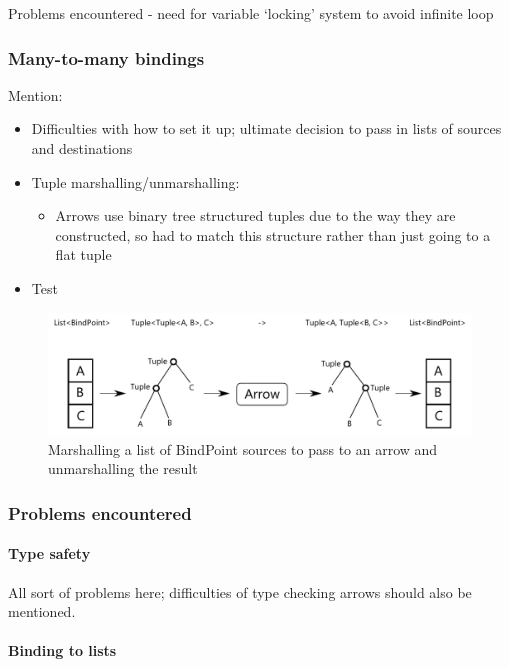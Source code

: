 \documentclass[12pt,twoside,notitlepage]{report}
\begin{document}
Problems encountered - need for variable ‘locking’ system to avoid infinite loop

\subsubsection{Many-to-many bindings}

Mention:

\begin{itemize}
	\item Difficulties with how to set it up; ultimate decision to pass in lists of sources and destinations
	\item Tuple marshalling/unmarshalling:
	\begin{itemize}
		\item Arrows use binary tree structured tuples due to the way they are constructed, so had to match this structure rather than just going to a flat tuple
	\end{itemize}
	\item Test
\end{itemize}

\begin{figure}[!ht]
  \centering
  \includegraphics[width=\textwidth]{fig/ArgumentMarshalling.pdf}
  \caption{Marshalling a list of BindPoint sources to pass to an arrow and unmarshalling the result}
  \label{fig:argument_marshalling}
\end{figure}

\subsubsection{Problems encountered}

\paragraph{Type safety}

All sort of problems here; difficulties of type checking arrows should also be mentioned.

\paragraph{Binding to lists}
\end{document}
